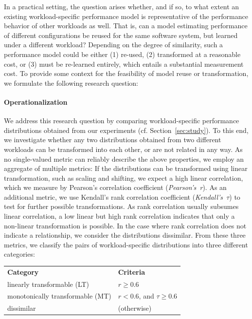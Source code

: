 In a practical setting, the question arises whether, and if so, to what extent an existing workload-specific performance model is representative of the performance behavior of other workloads as well. 
That is, can a model estimating performance of different configurations be reused for the same software system, but learned under a different workload?
Depending on the degree of similarity, such a performance model could be either (1) re-used, (2) transformed at a reasonable cost, or (3) must be re-learned entirely, which entails a substantial measurement cost. To provide some context for the feasibility of model reuse or transformation, we formulate the following research question: 


\paragraph*{Operationalization}
We address this research question by comparing workload-specific performance distributions obtained from our experiments (cf. Section~\ref{sec:study}). To this end, we investigate whether any two distributions obtained from two different workloads can be transformed into each other, or are not related in any way. As no single-valued metric can reliably describe the above properties, we employ an aggregate of multiple metrics: 
If the distributions can be transformed using linear transformation, such as scaling and shifting, we expect a high linear correlation, which we measure by Pearson’s correlation coefficient (\emph{Pearson's~r}). As an additional metric, we use Kendall’s rank correlation coefficient (\emph{Kendall's~$\tau$}) to test for further possible transformations. As rank correlation usually subsumes linear correlation, a low linear but high rank correlation indicates that only a non-linear transformation is possible. In the case where rank correlation does not indicate a relationship, we consider the distributions dissimilar. From these three metrics, we classify the pairs of workload-specific distributions into three different categories:
\vspace{1mm}

\begin{tabular}{p{4.4cm}l}
	 \textbf{Category} & \textbf{Criteria} \\
	{linearly transformable (LT)} & $r \geq 0.6$ \\
	{monotonically transformable (MT)} & $r < 0.6$, and $\tau \geq 0.6$ \\
	{dissimilar}  & (otherwise) \\%
\end{tabular}


